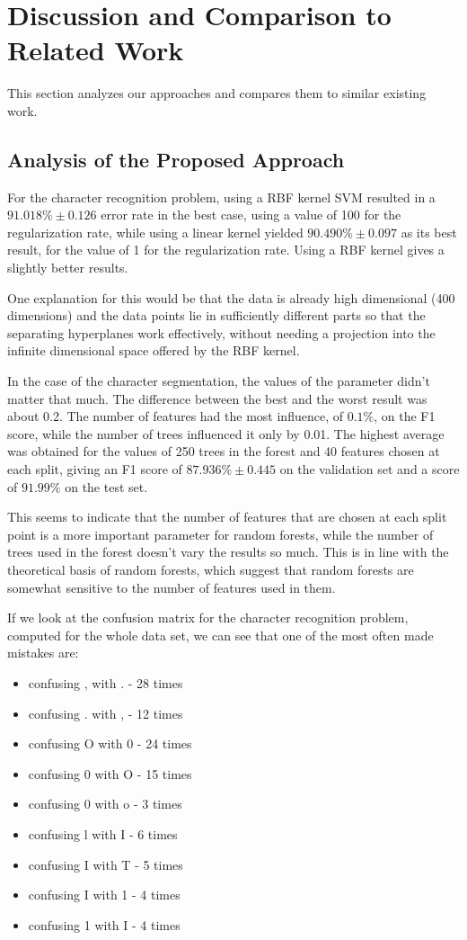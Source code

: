 \section{Discussion and Comparison to Related Work}
\label{sec:disc}

This section analyzes our approaches and compares them to similar existing work.

\subsection{Analysis of the Proposed Approach}
For the character recognition problem, using a RBF kernel SVM resulted in a $ 91.018\% \pm 0.126 $ error rate in the best case, using a value of 100 for the regularization rate, while using a linear kernel yielded $ 90.490\% \pm 0.097 $ as its best result, for the value of 1 for the regularization rate. Using a RBF kernel gives a slightly better results.

One explanation for this would be that the data is already high dimensional (400 dimensions) and the data points lie in sufficiently different parts so that the separating hyperplanes work effectively, without needing a projection into the infinite dimensional space offered by the RBF kernel. 

In the case of the character segmentation, the values of the parameter didn't matter that much. The difference between the best and the worst result was about 0.2. The number of features had the most influence, of $ 0.1\% $, on the F1 score, while the number of trees influenced it only by 0.01. The highest average was obtained for the values of 250 trees in the forest and 40 features chosen at each split, giving an F1 score of $ 87.936\% \pm 0.445$ on the validation set and a score of $ 91.99\% $ on the test set.  

This seems to indicate that the number of features that are chosen at each split point is a more important parameter for random forests, while the number of trees used in the forest doesn't vary the results so much. This is in line with the theoretical basis of random forests\cite{breiman2001random}, which suggest that random forests are somewhat sensitive to the number of features used in them. 

If we look at the confusion matrix for the character recognition problem, computed for the whole data set, we can see that one of the most often made mistakes are:
\begin{itemize}
\item confusing , with . - 28 times
\item confusing . with , - 12 times
\item confusing O with 0 - 24 times
\item confusing 0 with O - 15 times
\item confusing 0 with o - 3 times
\item confusing l with I - 6 times
\item confusing I with T - 5 times
\item confusing I with 1 - 4 times
\item confusing 1 with I - 4 times
\end{itemize} 

